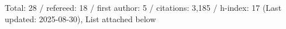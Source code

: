 Total: 28 / refereed: 18 / first author: 5 / citations: 3,185 / h-index: 17 (Last updated: 2025-08-30), List attached below